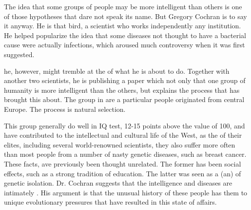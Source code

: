 
\qquad The idea that some groups of people may be more intelligent than others is one of those hypotheses that dare not speak its name. But Gregory Cochran is \underline{\quad}  to say it anyway. He is that \underline{\quad}  bird, a scientist who works independently \underline{\quad}  any institution. He helped popularize the idea that some diseases not \underline{\quad}  thought to have a bacterial cause were actually infections, which aroused much controversy when it was first suggested.

\qquad \underline{\quad} he, however, might tremble at the \underline{\quad}  of what he is about to do. Together with another two scientists, he is publishing a paper which not only \underline{\quad}  that one group of humanity is more intelligent than the others, but explains the process that has brought this about. The group in \underline{\quad} are a particular people originated from central Europe. The process is natural selection.

\qquad This group generally do well in IQ test, \underline{\quad} 12-15 points above the \underline{\quad}  value of 100, and have contributed \underline{\quad}  to the intellectual and cultural life of the West, as the \underline{\quad}  of their elites, including several world-renowned scientists, \underline{\quad} they also suffer more often than most people from a number of nasty genetic diseases, such as breast cancer. These facts, \underline{\quad} ave previously been thought unrelated. The former has been \underline{\quad}  social effects, such as a strong tradition of \underline{\quad} education. The latter was seen as a (an) \underline{\quad} of genetic isolation. Dr. Cochran suggests that the intelligence and diseases are intimately \underline{\quad}. His argument is that the unusual history of these people has \underline{\quad} them to unique evolutionary pressures that have resulted in this \underline{\quad} state of affairs.

\vspace{6pt}

